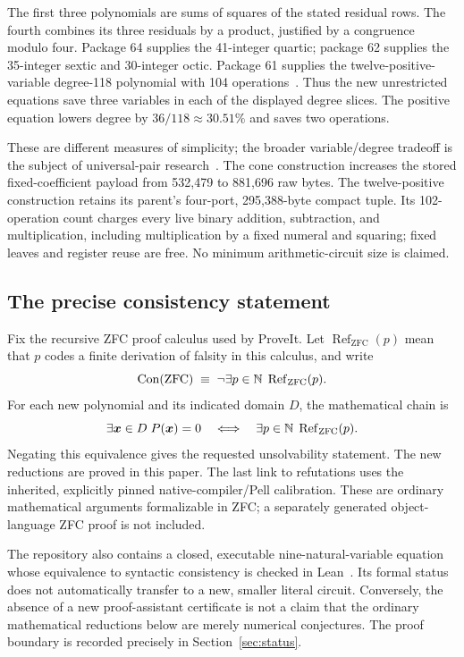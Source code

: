 \documentclass[11pt]{article}
\theoremstyle{remark}\newtheorem{remark}[theorem]{Remark}
\newcommand{\Pcost}{102}
\begin{document}
The first three polynomials are sums of squares of the stated residual rows. The fourth combines its three residuals by a product, justified by a congruence modulo four. Package 64 supplies the 41-integer quartic; package 62 supplies the 35-integer sextic and 30-integer octic. Package 61 supplies the twelve-positive-variable degree-118 polynomial with 104 operations~\cite{q41,q62,p61}. Thus the new unrestricted equations save three variables in each of the displayed degree slices. The positive equation lowers degree by $36/118\approx30.51\%$ and saves two operations.

These are different measures of simplicity; the broader variable/degree tradeoff is the subject of universal-pair research~\cite{bdhms}. The cone construction increases the stored fixed-coefficient payload from 532,479 to 881,696 raw bytes. The twelve-positive construction retains its parent's four-port, 295,388-byte compact tuple. Its \Pcost-operation count charges every live binary addition, subtraction, and multiplication, including multiplication by a fixed numeral and squaring; fixed leaves and register reuse are free. No minimum arithmetic-circuit size is claimed.

\subsection{The precise consistency statement}

Fix the recursive ZFC proof calculus used by ProveIt. Let $\operatorname{Ref}_{\mathrm{ZFC}}(p)$ mean that $p$ codes a finite derivation of falsity in this calculus, and write
\[
 \operatorname{Con}(\mathrm{ZFC})\;\equiv\;\neg\exists p\in\mathbb N\;\operatorname{Ref}_{\mathrm{ZFC}}(p).
\]
For each new polynomial and its indicated domain $D$, the mathematical chain is
\begin{equation}\label{eq:goal}
 \exists\boldsymbol x\in D\;P(\boldsymbol x)=0
 \quad\Longleftrightarrow\quad
 \exists p\in\mathbb N\;\operatorname{Ref}_{\mathrm{ZFC}}(p).
\end{equation}
Negating this equivalence gives the requested unsolvability statement. The new reductions are proved in this paper. The last link to refutations uses the inherited, explicitly pinned native-compiler/Pell calibration. These are ordinary mathematical arguments formalizable in ZFC; a separately generated object-language ZFC proof is not included.

The repository also contains a closed, executable nine-natural-variable equation whose equivalence to syntactic consistency is checked in Lean~\cite{explicit}. Its formal status does not automatically transfer to a new, smaller literal circuit. Conversely, the absence of a new proof-assistant certificate is not a claim that the ordinary mathematical reductions below are merely numerical conjectures. The proof boundary is recorded precisely in Section~\ref{sec:status}.
\end{document}
